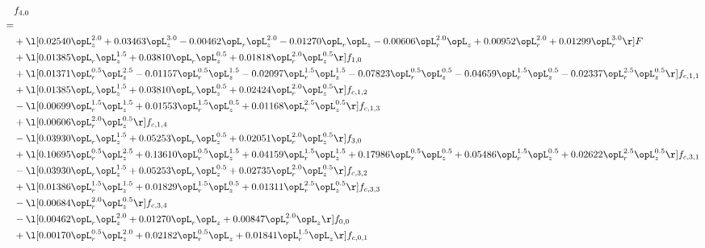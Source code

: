 \begin{alignat}{2} 
\label{eq:f_40_1} 
& f_{4,0} \nonumber \\ 
 = \\ 
& + \l[  0.02540 \opL_z^{2.0} +  0.03463 \opL_z^{3.0}   -0.00462 \opL_r \opL_z^{2.0}   -0.01270 \opL_r \opL_z   -0.00606 \opL_r^{2.0} \opL_z +  0.00952 \opL_r^{2.0} +  0.01299 \opL_r^{3.0}  \r] F \nonumber \\ 
& + \l[  0.01385 \opL_r \opL_z^{1.5} +  0.03810 \opL_r \opL_z^{0.5} +  0.01818 \opL_r^{2.0} \opL_z^{0.5}  \r] f_{1,0} \nonumber \\ 
& + \l[  0.01371 \opL_r^{0.5} \opL_z^{2.5}   -0.01157 \opL_r^{0.5} \opL_z^{1.5}   -0.02097 \opL_r^{1.5} \opL_z^{1.5}   -0.07823 \opL_r^{0.5} \opL_z^{0.5}   -0.04659 \opL_r^{1.5} \opL_z^{0.5}   -0.02337 \opL_r^{2.5} \opL_z^{0.5}  \r] f_{c,1,1} \nonumber \\ 
& + \l[  0.01385 \opL_r \opL_z^{1.5} +  0.03810 \opL_r \opL_z^{0.5} +  0.02424 \opL_r^{2.0} \opL_z^{0.5}  \r] f_{c,1,2} \nonumber \\ 
& - \l[  0.00699 \opL_r^{1.5} \opL_z^{1.5} +  0.01553 \opL_r^{1.5} \opL_z^{0.5} +  0.01168 \opL_r^{2.5} \opL_z^{0.5}  \r] f_{c,1,3} \nonumber \\ 
& + \l[  0.00606 \opL_r^{2.0} \opL_z^{0.5}  \r] f_{c,1,4} \nonumber \\ 
& - \l[  0.03930 \opL_r \opL_z^{1.5} +  0.05253 \opL_r \opL_z^{0.5} +  0.02051 \opL_r^{2.0} \opL_z^{0.5}  \r] f_{3,0} \nonumber \\ 
& + \l[  0.10695 \opL_r^{0.5} \opL_z^{2.5} +  0.13610 \opL_r^{0.5} \opL_z^{1.5} +  0.04159 \opL_r^{1.5} \opL_z^{1.5} +  0.17986 \opL_r^{0.5} \opL_z^{0.5} +  0.05486 \opL_r^{1.5} \opL_z^{0.5} +  0.02622 \opL_r^{2.5} \opL_z^{0.5}  \r] f_{c,3,1} \nonumber \\ 
& - \l[  0.03930 \opL_r \opL_z^{1.5} +  0.05253 \opL_r \opL_z^{0.5} +  0.02735 \opL_r^{2.0} \opL_z^{0.5}  \r] f_{c,3,2} \nonumber \\ 
& + \l[  0.01386 \opL_r^{1.5} \opL_z^{1.5} +  0.01829 \opL_r^{1.5} \opL_z^{0.5} +  0.01311 \opL_r^{2.5} \opL_z^{0.5}  \r] f_{c,3,3} \nonumber \\ 
& - \l[  0.00684 \opL_r^{2.0} \opL_z^{0.5}  \r] f_{c,3,4} \nonumber \\ 
& - \l[  0.00462 \opL_r \opL_z^{2.0} +  0.01270 \opL_r \opL_z +  0.00847 \opL_r^{2.0} \opL_z  \r] f_{0,0} \nonumber \\ 
& + \l[  0.00170 \opL_r^{0.5} \opL_z^{2.0} +  0.02182 \opL_r^{0.5} \opL_z +  0.01841 \opL_r^{1.5} \opL_z  \r] f_{c,0,1} \nonumber \\ 

\end{alignat}
